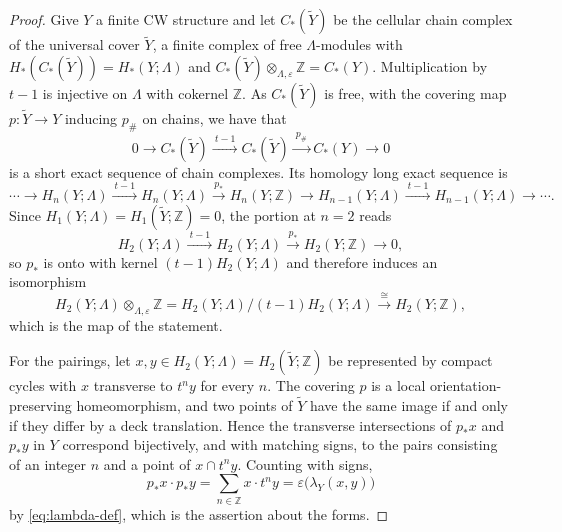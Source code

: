 \documentclass[10pt,a4paper]{amsart}
\newcommand{\Z}{\mathbb Z}
\begin{document}
\begin{proof}
  Give $Y$ a finite CW structure and let $C_*(\widetilde Y)$ be the
  cellular chain complex of the universal cover ${\widetilde {Y}}$, a
  finite complex of free $\Lambda$-modules with $H_*(C_*(\widetilde
  Y))=H_*(Y;\Lambda)$ and $C_*(\widetilde
  Y)\otimes_{\Lambda,\varepsilon}\Z=C_*(Y)$.  Multiplication by $t-1$
  is injective on $\Lambda$ with cokernel $\Z$. As $C_*(\widetilde Y)$
  is free, with the covering map $p\colon {\widetilde {Y}}\to Y$
  inducing $p_{\#}$ on chains, we have that
\[
 0\longrightarrow C_*(\widetilde Y)\xrightarrow{\ t-1\ }C_* (\widetilde Y)
 \xrightarrow{\ p_\#\ }C_*(Y)\longrightarrow0
\]
is a short exact sequence of chain complexes.  Its homology long exact
sequence is
\[
 \cdots\to H_n(Y;\Lambda)\xrightarrow{\ t-1\ }H_n(Y;\Lambda)
 \xrightarrow{\ p_*\ }H_n(Y;\Z)\to H_{n-1}(Y;\Lambda)
 \xrightarrow{\ t-1\ }H_{n-1}(Y;\Lambda)\to\cdots .
\]
Since $H_1(Y;\Lambda)=H_1(\widetilde Y;\Z)=0$, the portion at $n=2$ reads
\[
 H_2(Y;\Lambda)\xrightarrow{\ t-1\ }H_2(Y;\Lambda)
 \xrightarrow{\ p_*\ }H_2(Y;\Z)\longrightarrow0 ,
\]
so $p_*$ is onto with kernel $(t-1)H_2(Y;\Lambda)$ and therefore induces an
isomorphism
\[
 H_2(Y;\Lambda)\otimes_{\Lambda,\varepsilon}\Z
 =H_2(Y;\Lambda)/(t-1)H_2(Y;\Lambda)
 \xrightarrow{\ \cong\ }H_2(Y;\Z),
\]
which is the map of the statement.

For the pairings, let $x,y\in H_2(Y;\Lambda)=H_2(\widetilde Y;\Z)$ be
represented by compact cycles with $x$ transverse to $t^ny$ for every $n$.
The covering $p$ is a local orientation-preserving homeomorphism, and two
points of $\widetilde Y$ have the same image if and only if they differ by a
deck translation.  Hence the transverse intersections of $p_*x$ and $p_*y$
in $Y$ correspond bijectively, and with matching signs, to the pairs
consisting of an integer $n$ and a point of $x\cap t^ny$.  Counting with
signs,
\[
 p_*x\cdot p_*y=\sum_{n\in\Z}x\cdot t^ny
 =\varepsilon\bigl(\lambda_Y(x,y)\bigr)
\]
by \eqref{eq:lambda-def}, which is the assertion about the forms.
\end{proof}
\end{document}
